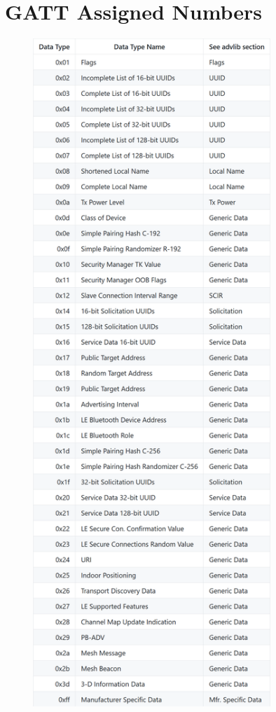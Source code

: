 \chapter{GATT Assigned Numbers}
\label{appendixA}
\thispagestyle{empty}

\begin{figure}
	\centering
	\begin{minipage}{0.9\textwidth}
		\centering
		\includegraphics[width=0.8\textwidth]{GAP-assigned-numbers.png}
	\end{minipage}
	\label{fig1-GAP-numbers}
\end{figure}